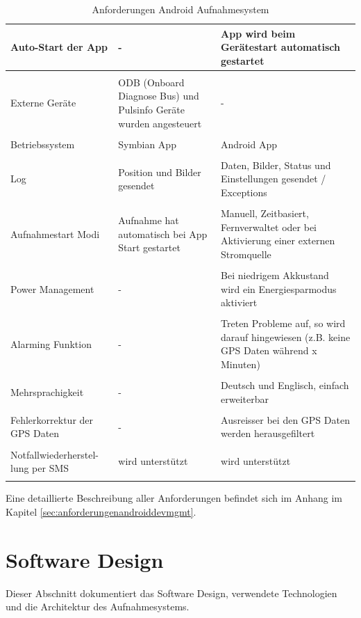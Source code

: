 \begin{longtable}{  p{3.5cm} | p{4.3cm} | p{4.3cm} }
	Auto-Start der App & - & App wird beim Ger\"{a}testart automatisch gestartet\\ [1ex] \hline & &  \\ [-1.5ex]
    Externe Ger\"{a}te & ODB (Onboard Diagnose Bus) und Pulsinfo Ger\"{a}te wurden angesteuert & -\\ [1ex] \hline & &  \\ [-1.5ex]
    Betriebssystem & Symbian App & Android App\\ [1ex] \hline & &  \\ [-1.5ex]
    Log & Position und Bilder gesendet & Daten, Bilder, Status und Einstellungen gesendet / Exceptions\\ [1ex] \hline & &  \\ [-1.5ex]
    Aufnahmestart Modi & Aufnahme hat automatisch bei App Start gestartet & Manuell, Zeitbasiert, Fernverwaltet oder bei Aktivierung einer externen Stromquelle\\ [1ex] \hline & &  \\ [-1.5ex]
   	Power Management & - & Bei niedrigem Akkustand wird ein Energiesparmodus aktiviert\\ [1ex] \hline & &  \\ [-1.5ex]
    Alarming Funktion & - & Treten Probleme auf, so wird darauf hingewiesen (z.B. keine GPS Daten w\"{a}hrend x Minuten)\\ [1ex] \hline & &  \\ [-1.5ex]
    Mehrsprachigkeit & - & Deutsch und Englisch, einfach erweiterbar\\ [1ex] \hline & &  \\ 
    [-1.5ex] Fehlerkorrektur der GPS Daten & - & Ausreisser bei den GPS Daten werden herausgefiltert\\ [1ex] \hline & &  \\ 
    [-1.5ex] Notfallwiederherstel- lung per SMS & wird unterstützt & wird unterstützt\\ [1ex]
    
\caption{Anforderungen Android Aufnahmesystem}
\end{longtable}

Eine detaillierte Beschreibung aller Anforderungen befindet sich im Anhang im Kapitel \ref{sec:anforderungenandroiddevmgmt}.

\section{Software Design}
Dieser Abschnitt dokumentiert das Software Design, verwendete Technologien und die Architektur des Aufnahmesystems.

